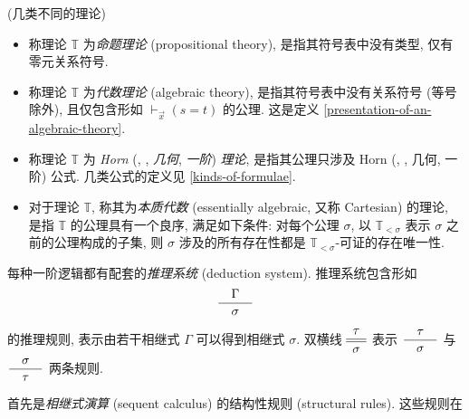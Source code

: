 \begin{definition}
	[label={kinds-of-theories}]
	{(几类不同的理论)}
	\begin{itemize}
		\item 称理论 $\mathbb T$ 为\emph{命题理论} (propositional theory), 是指其符号表中没有类型, 仅有零元关系符号.
		\item 称理论 $\mathbb T$ 为\emph{代数理论} (algebraic theory), 是指其符号表中没有关系符号 (等号除外), 且仅包含形如 $\vdash_{\vec x} (s=t)$ 的公理. 这是定义 \ref{presentation-of-an-algebraic-theory}.
		\item 称理论 $\mathbb T$ 为 \emph{Horn} (\emph{\regular{}}, \emph{\coherent{}}, \emph{几何}, \emph{一阶}) \emph{理论}, 是指其公理只涉及 Horn (\regular{}, \coherent{}, 几何, 一阶) 公式. 几类公式的定义见 \ref{kinds-of-formulae}.
		\item 对于\regular{}理论 $\mathbb T$, 称其为\emph{本质代数} (essentially algebraic, 又称 Cartesian) 的理论, 是指 $\mathbb T$ 的公理具有一个良序, 满足如下条件: 对每个公理 $\sigma$, 以 $\mathbb T_{<\sigma}$ 表示 $\sigma$ 之前的公理构成的子集,
		则 $\sigma$ 涉及的所有存在性都是 $\mathbb T_{<\sigma}$-可证的存在唯一性.
	\end{itemize}
\end{definition}

%	




每种一阶逻辑都有配套的\emph{推理系统} (deduction system). 推理系统包含形如
$$
\dfrac{\quad \Gamma \quad}{\quad \sigma \quad}
$$
的推理规则, 表示由若干相继式 $\Gamma$ 可以得到相继式 $\sigma$.
双横线 $\begin{array} {c} \tau \\ \hline \hline \sigma \end{array}$ 表示 $\dfrac{\quad \tau \quad}{\quad \sigma \quad}$ 与 $\dfrac{\quad \sigma \quad}{\quad \tau \quad}$ 两条规则.

首先是\emph{相继式演算} (sequent calculus) 的结构性规则 (structural rules). 这些规则在

